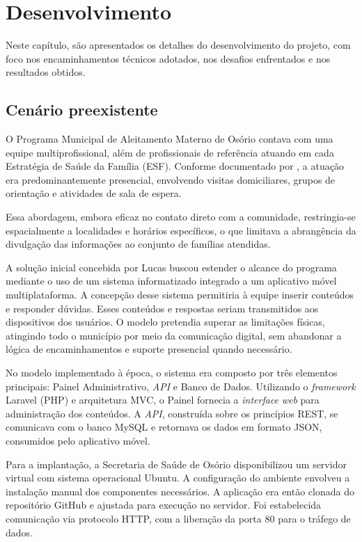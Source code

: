 \chapter{Desenvolvimento}

Neste capítulo, são apresentados os detalhes do desenvolvimento do projeto, com foco nos encaminhamentos técnicos adotados, nos desafios enfrentados e nos resultados obtidos.

\section{Cenário preexistente}

O Programa Municipal de Aleitamento Materno de Osório contava com uma equipe multiprofissional, além de profissionais de referência atuando em cada Estratégia de Saúde da Família (ESF). Conforme documentado por \cite{silva2018painelpromama}, a atuação era predominantemente presencial, envolvendo visitas domiciliares, grupos de orientação e atividades de sala de espera. 

Essa abordagem, embora eficaz no contato direto com a comunidade, restringia-se espacialmente a localidades e horários específicos, o que limitava a abrangência da divulgação das informações ao conjunto de famílias atendidas.

A solução inicial concebida por Lucas buscou estender o alcance do programa mediante o uso de um sistema informatizado integrado a um aplicativo móvel multiplataforma. A concepção desse sistema permitiria à equipe inserir conteúdos e responder dúvidas. Esses conteúdos e respostas seriam transmitidos aos dispositivos dos usuários. O modelo pretendia superar as limitações físicas, atingindo todo o município por meio da comunicação digital, sem abandonar a lógica de encaminhamentos e suporte presencial quando necessário.

No modelo implementado à época, o sistema era composto por três elementos principais: Painel Administrativo, \emph{API} e Banco de Dados. Utilizando o \emph{framework} Laravel (PHP) e arquitetura MVC, o Painel fornecia a \emph{interface} \emph{web} para administração dos conteúdos. A \emph{API}, construída sobre os princípios REST, se comunicava com o banco MySQL e retornava os dados em formato JSON, consumidos pelo aplicativo móvel.

Para a implantação, a Secretaria de Saúde de Osório disponibilizou um servidor virtual com sistema operacional Ubuntu. A configuração do ambiente envolveu a instalação manual dos componentes necessários. A aplicação era então clonada do repositório GitHub e ajustada para execução no servidor. Foi estabelecida comunicação via protocolo HTTP, com a liberação da porta 80 para o tráfego de dados.


